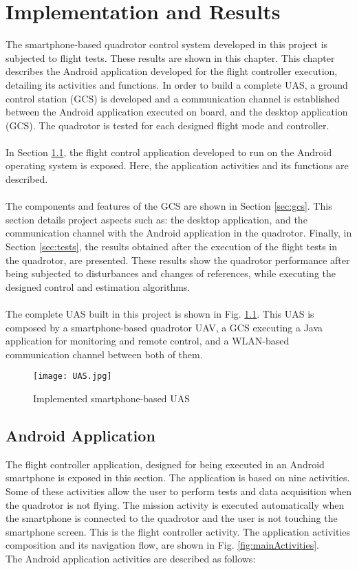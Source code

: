 \chapter{Implementation and Results} \label{ch:implementation}
The smartphone-based quadrotor control system developed in this project is subjected to flight tests. These results are shown in this chapter. This chapter describes the Android application developed for the flight controller execution, detailing its activities and functions. In order to build a complete UAS, a ground control station (GCS) is developed and a communication channel is established between the Android application executed on board, and the desktop application (GCS). The quadrotor is tested for each designed flight mode and controller.
\\\\
In Section \ref{sec:app}, the flight control application developed to run on the Android operating system is exposed. Here, the application activities and its functions are described.
\\\\
The components and features of the GCS are shown in Section \ref{sec:gcs}. This section details project aspects such as: the desktop application, and the communication channel with the Android application in the quadrotor. Finally, in Section \ref{sec:tests}, the results obtained after the execution of the flight tests in the quadrotor, are presented. These results show the quadrotor performance after being subjected to disturbances and changes of references, while executing the designed control and estimation algorithms.
\\\\
The complete UAS built in this project is shown in Fig. \ref{fig:UAS}. This UAS is composed by a smartphone-based quadrotor UAV, a GCS executing a Java application for monitoring and remote control, and a WLAN-based communication channel between both of them.
\begin{figure}[h]
\begin{center}
\texttt{[image: UAS.jpg]}  
\caption{Implemented smartphone-based UAS} 
\label{fig:UAS}
\end{center}
\end{figure}

\section{Android Application} \label{sec:app}
The flight controller application, designed for being executed in an Android smartphone is exposed in this section. The application is based on nine activities. Some of these activities allow the user to perform tests and data acquisition when the quadrotor is not flying. The mission activity is executed automatically when the smartphone is connected to the quadrotor and the user is not touching the smartphone screen. This is the flight controller activity. The application activities composition and its navigation flow, are shown in Fig. \ref{fig:mainActivities}.
\\
The Android application activities are described as follows:

